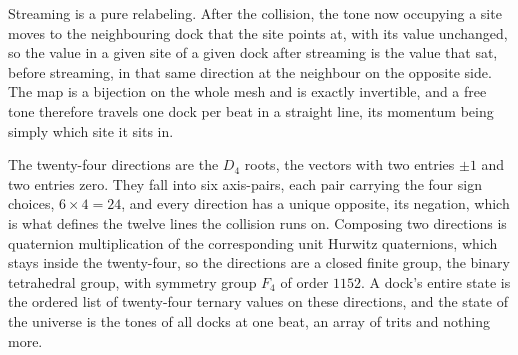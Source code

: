 Streaming is a pure relabeling. After the collision, the tone now occupying a site moves to the neighbouring dock that the site points at, with its value unchanged, so the value in a given site of a given dock after streaming is the value that sat, before streaming, in that same direction at the neighbour on the opposite side. The map is a bijection on the whole mesh and is exactly invertible, and a free tone therefore travels one dock per beat in a straight line, its momentum being simply which site it sits in.

The twenty-four directions are the $D_4$ roots, the vectors with two entries $\pm 1$ and two entries zero. They fall into six axis-pairs, each pair carrying the four sign choices, $6 \times 4 = 24$, and every direction has a unique opposite, its negation, which is what defines the twelve lines the collision runs on. Composing two directions is quaternion multiplication of the corresponding unit Hurwitz quaternions, which stays inside the twenty-four, so the directions are a closed finite group, the binary tetrahedral group, with symmetry group $F_4$ of order $1152$. A dock's entire state is the ordered list of twenty-four ternary values on these directions, and the state of the universe is the tones of all docks at one beat, an array of trits and nothing more.
